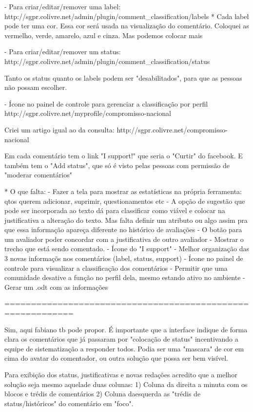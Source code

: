 \documentclass[12pt]{article}
\begin{document}
- Para criar/editar/remover uma label:
http://sgpr.colivre.net/admin/plugin/comment\_classification/labels
  * Cada label pode ter uma cor. Essa cor será usada na visualização do comentário. Coloquei as vermelho, verde, amarelo, azul e cinza. Mas podemos colocar mais

- Para criar/editar/remover um status:
http://sgpr.colivre.net/admin/plugin/comment\_classification/status

Tanto os status quanto os labels podem ser "desabilitados", para que as pessoas não possam escolher.

- Ícone no painel de controle para gerenciar a classificação por perfil
http://sgpr.colivre.net/myprofile/compromisso-nacional

Criei um artigo igual ao da consulta:
http://sgpr.colivre.net/compromisso-nacional

Em cada comentário tem o link "I support!" que seria o "Curtir" do facebook.
E também tem o "Add status", que só é visto pelas pessoas com permissão de "moderar comentários"

* O que falta:
 -  Fazer a tela para mostrar as estatísticas na própria ferramenta: qtos querem adicionar, suprimir, questionamentos etc
 -  A opção de sugestão que pode ser incorporada ao texto dá para classificar como viável e colocar na justificativa a alteração do texto. Mas falta definir um atributo ou algo assim pra que essa informação apareça diferente no histórico de avaliações
 - O botão para um avaliador poder concordar com a justificativa de outro avaliador
 - Mostrar o trecho que está sendo comentado.
 - Ícone do "I support"
 - Melhor organização das 3 novas informaçõs nos comentários (label, status, support)
 - Ícone no painel de controle para visualizar a classificação dos comentários
 - Permitir que uma comunidade desative a função no perfil dela, mesmo estando ativo no ambiente
 - Gerar um .odt com as informações

===========================================================

Sim, aqui fabiano tb pode propor. É importante que a interface indique de forma clara os comentários que já passaram por "colocação de status" incentivando a equipe de sistematização a responder todos. Podia ser uma "mascara" de cor em cima do avatar do comentador, ou outra solução que possa ser bem visível. 

Para exibição dos status, justificativas e novas redações acredito que a melhor solução seja mesmo aquelade duas colunas: 1) Coluna da direita a minuta com os blocos e trédis de comentários 2) Coluna daesquerda as "trédis de status/históricos" do comentário em "foco".
 
\end{document}
